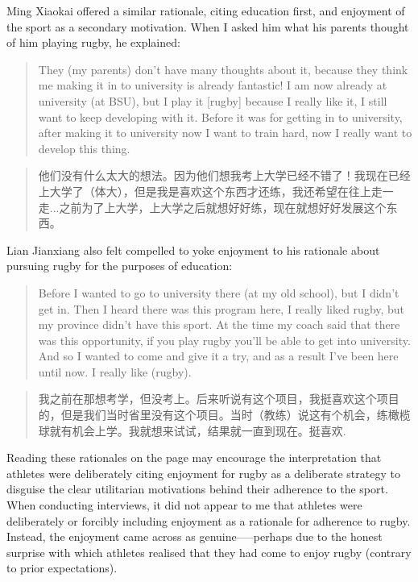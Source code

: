 \begin{CJK}{UTF8}{gbsn}
Ming Xiaokai offered a similar rationale, citing education first, and enjoyment of the sport as a secondary motivation.  When I asked him what his parents thought of him playing rugby, he explained:

        \begin{quote}
          They (my parents) don't have many thoughts about it, because they think me making it in to university is already fantastic! I am now already at university (at BSU), but I play it [rugby] because I really like it, I still want to keep developing with it. Before it was for getting in to university, after making it to university now I want to train hard, now I really want to develop this thing.
          \end{quote}
        \begin{quote}
           他们没有什么太大的想法。因为他们想我考上大学已经不错了！我现在已经上大学了（体大），但是我是喜欢这个东西才还练，我还希望在往上走一走...之前为了上大学，上大学之后就想好好练，现在就想好好发展这个东西。
         \end{quote}

Lian Jianxiang also felt compelled to yoke enjoyment to his rationale about pursuing rugby for the purposes of education:
               \begin{quote}
                       Before I wanted to go to university there (at my old school), but I didn't get in.  Then I heard there was this program here, I really liked rugby, but my province didn't have this sport. At the time my coach said that there was this opportunity, if you play rugby you'll be able to get into university.  And so I wanted to come and give it a try, and as a result I've been here until now.  I really like (rugby).
               \end{quote}
               \begin{quote}
                   我之前在那想考学，但没考上。后来听说有这个项目，我挺喜欢这个项目的，但是我们当时省里没有这个项目。当时（教练）说这有个机会，练橄榄球就有机会上学。我就想来试试，结果就一直到现在。挺喜欢.
               \end{quote}

Reading these rationales on the page may encourage the interpretation that athletes were deliberately citing enjoyment for rugby as a deliberate strategy to disguise the clear utilitarian motivations behind their adherence to the sport.  When conducting interviews, it did not appear to me that athletes were deliberately or forcibly including enjoyment as a rationale for adherence to rugby.  Instead, the enjoyment came across as genuine—--perhaps due to the honest surprise with which athletes realised that they had come to enjoy rugby (contrary to prior expectations).


\end{CJK}
